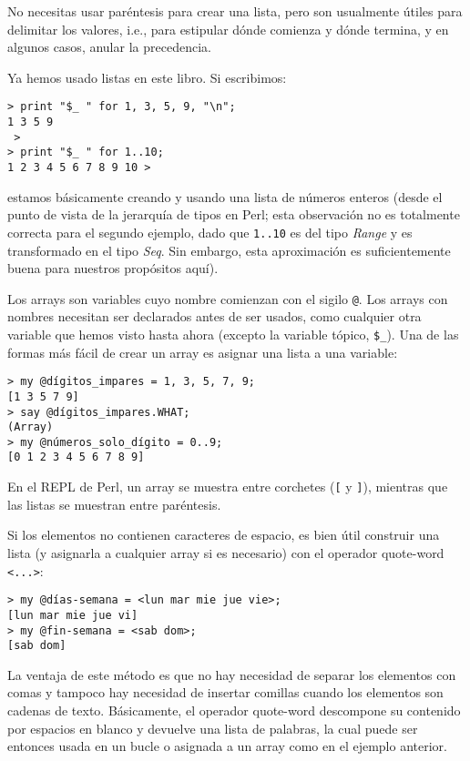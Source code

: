 No necesitas usar paréntesis para crear una lista,
pero son usualmente útiles para delimitar los valores,
i.e., para estipular dónde comienza y dónde termina, y
en algunos casos, anular la precedencia.

Ya hemos usado listas en este libro. Si escribimos:

\begin{verbatim}
> print "$_ " for 1, 3, 5, 9, "\n";
1 3 5 9
 >
> print "$_ " for 1..10;
1 2 3 4 5 6 7 8 9 10 >
\end{verbatim}

estamos básicamente creando y usando una lista de números
enteros (desde el punto de vista de la jerarquía de tipos en
Perl; esta observación no es totalmente correcta para el segundo
ejemplo, dado que \verb|1..10| es del tipo \emph{Range} y
es transformado en el tipo \emph{Seq}. Sin embargo, esta 
aproximación es suficientemente buena para nuestros 
propósitos aquí).

Los arrays son variables cuyo nombre comienzan con
el sigilo \verb|@|. Los arrays con nombres necesitan ser declarados
antes de ser usados, como cualquier otra variable que hemos
visto hasta ahora (excepto la variable tópico, \verb|$_|). 
Una de las formas más fácil de crear un array es asignar una
lista a una variable:

\begin{verbatim}
> my @dígitos_impares = 1, 3, 5, 7, 9;
[1 3 5 7 9]
> say @dígitos_impares.WHAT;
(Array)
> my @números_solo_dígito = 0..9;
[0 1 2 3 4 5 6 7 8 9]
\end{verbatim}

En el REPL de Perl, un array se muestra entre corchetes
(\verb|[| y \verb|]|), mientras que las listas se muestran
entre paréntesis.

Si los elementos no contienen caracteres de espacio, es bien útil
construir una lista (y asignarla a cualquier array si es necesario)
con el operador quote-word \verb|<...>|:

\begin{verbatim}
> my @días-semana = <lun mar mie jue vie>;
[lun mar mie jue vi]
> my @fin-semana = <sab dom>;
[sab dom]
\end{verbatim}

La ventaja de este método es que no hay necesidad de separar los 
elementos con comas y tampoco hay necesidad de insertar comillas
cuando los elementos son cadenas de texto. Básicamente, el operador
quote-word descompone su contenido por espacios en blanco y devuelve
una lista de palabras, la cual puede ser entonces usada en un bucle
o asignada a un array como en el ejemplo anterior.

